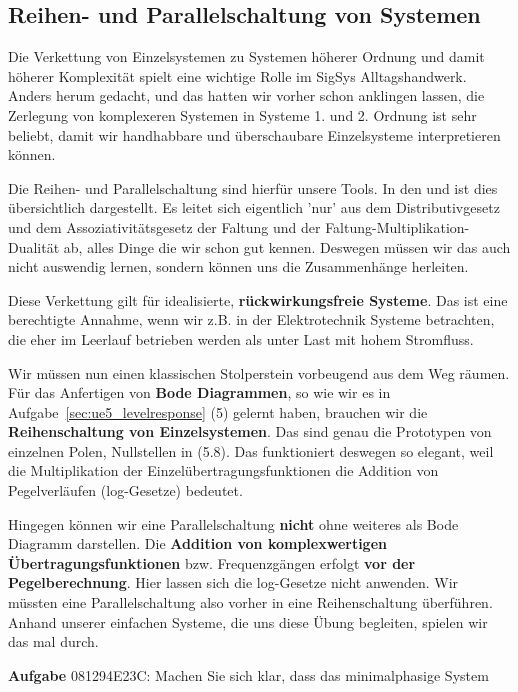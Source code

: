\subsection{Reihen- und Parallelschaltung von Systemen}
\label{sec:081294E23C}
\begin{Ziel}
Die Verkettung von Einzelsystemen zu Systemen höherer Ordnung und damit
höherer Komplexität spielt eine wichtige Rolle im SigSys Alltagshandwerk.
Anders herum gedacht, und das hatten wir vorher schon anklingen lassen, die
Zerlegung von komplexeren Systemen in Systeme 1. und 2. Ordnung ist
sehr beliebt, damit wir handhabbare und überschaubare Einzelsysteme interpretieren
können.

Die Reihen- und Parallelschaltung
sind hierfür unsere Tools.
In den  und 
ist dies übersichtlich dargestellt. Es leitet sich eigentlich 'nur' aus dem
Distributivgesetz und dem Assoziativitätsgesetz der Faltung und der
Faltung-Multiplikation-Dualität ab, alles Dinge die wir schon gut kennen.
Deswegen müssen wir das auch nicht auswendig lernen, sondern können uns
die Zusammenhänge herleiten.

Diese Verkettung gilt für idealisierte, \textbf{rückwirkungsfreie Systeme}.
Das ist eine berechtigte Annahme, wenn wir z.B. in der Elektrotechnik Systeme
betrachten, die eher im Leerlauf betrieben werden als unter Last mit hohem Stromfluss.


Wir müssen nun einen klassischen Stolperstein vorbeugend aus dem Weg räumen.
Für das Anfertigen von \textbf{Bode Diagrammen}, so wie wir es in Aufgabe~\ref{sec:ue5_levelresponse} (5) gelernt haben,
brauchen wir die \textbf{Reihenschaltung von Einzelsystemen}. Das sind
genau die Prototypen von einzelnen Polen, Nullstellen in  (5.8).
Das funktioniert deswegen so elegant, weil die Multiplikation der
Einzelübertragungsfunktionen die Addition von Pegelverläufen (log-Gesetze)
bedeutet.

Hingegen können wir eine Parallelschaltung \textbf{nicht} ohne weiteres
als Bode Diagramm darstellen.
Die \textbf{Addition von komplexwertigen Übertragungsfunktionen} bzw. Frequenzgängen
erfolgt \textbf{vor der Pegelberechnung}. Hier lassen sich die log-Gesetze nicht anwenden.
Wir müssten eine Parallelschaltung also vorher in eine Reihenschaltung überführen.
%
Anhand unserer einfachen Systeme, die uns diese Übung begleiten, spielen wir das
mal durch.

\end{Ziel}
\textbf{Aufgabe} {\tiny 081294E23C}: Machen Sie sich klar, dass das minimalphasige System
